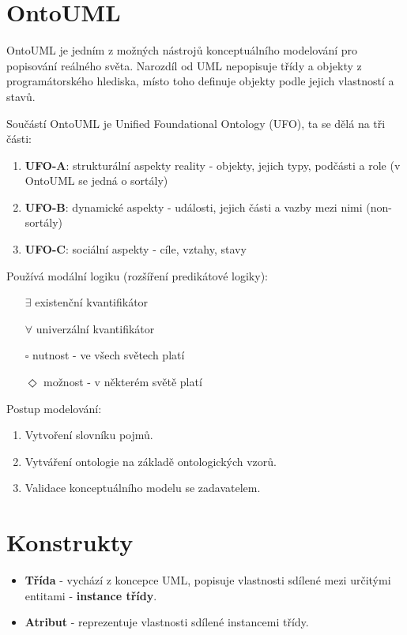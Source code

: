 \documentclass{szzclass}
\begin{document}
\tableofcontents
\newpage

\section{OntoUML}
OntoUML je jedním z možných nástrojů konceptuálního modelování pro popisování reálného světa. Narozdíl od UML nepopisuje třídy a objekty z programátorského hlediska, místo toho definuje objekty podle jejich vlastností a stavů.

Součástí OntoUML je Unified Foundational Ontology (UFO), ta se dělá na tři části:
\begin{enumerate}
  \item \textbf{UFO-A}: strukturální aspekty reality - objekty, jejich typy, podčásti a role (v OntoUML se jedná o sortály)
  \item \textbf{UFO-B}: dynamické aspekty - události, jejich části a vazby mezi nimi (non-sortály)
  \item \textbf{UFO-C}: sociální aspekty - cíle, vztahy, stavy
\end{enumerate}

Používá modální logiku (rozšíření predikátové logiky):
\begin{itemize}
  \item[$\exists$] existenční kvantifikátor
  \item[$\forall$] univerzální kvantifikátor
  \item[$\square$] nutnost - ve všech světech platí
  \item[$\Diamond$] možnost - v některém světě platí
\end{itemize}

Postup modelování:
\begin{enumerate}
\item Vytvoření slovníku pojmů.
\item Vytváření ontologie na základě ontologických vzorů.
\item Validace konceptuálního modelu se zadavatelem.
\end{enumerate}

\section{Konstrukty}

\begin{itemize}
\item \textbf{Třída} - vychází z koncepce UML, popisuje vlastnosti sdílené mezi určitými entitami - \textbf{instance třídy}.
\item \textbf{Atribut} - reprezentuje vlastnosti sdílené instancemi třídy.
\end{itemize}
\end{document}
